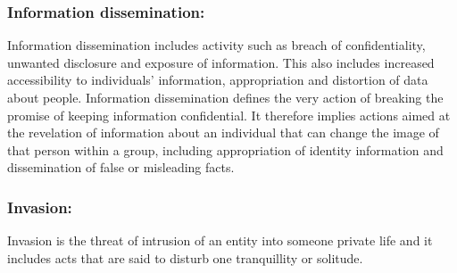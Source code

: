 \subsubsection{Information dissemination:}
Information dissemination includes activity such as breach of confidentiality, unwanted disclosure and exposure of information. This also includes increased accessibility to individuals' information, appropriation and distortion of data about people. Information dissemination defines the very action of breaking the promise of keeping information confidential. It therefore implies actions aimed at the revelation of information about an individual that can change the image of that person within a group, including appropriation of identity information and dissemination of false or misleading facts. 
 
\subsubsection{Invasion:}
Invasion is the threat of intrusion of an entity into someone private life and it includes acts that are said to disturb one tranquillity or solitude.

